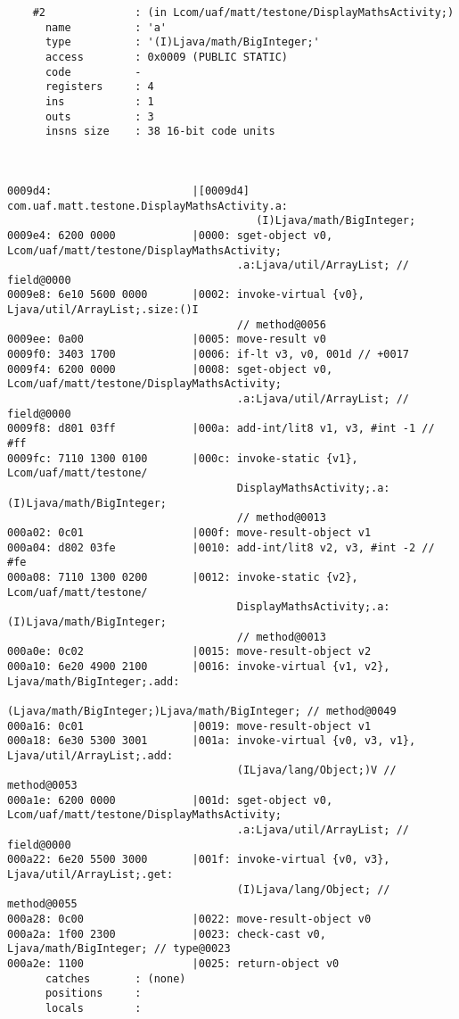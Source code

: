 \begin{lstlisting}
    #2              : (in Lcom/uaf/matt/testone/DisplayMathsActivity;)
      name          : 'a'
      type          : '(I)Ljava/math/BigInteger;'
      access        : 0x0009 (PUBLIC STATIC)
      code          -
      registers     : 4
      ins           : 1
      outs          : 3
      insns size    : 38 16-bit code units



0009d4:                      |[0009d4] com.uaf.matt.testone.DisplayMathsActivity.a:
                                       (I)Ljava/math/BigInteger;
0009e4: 6200 0000            |0000: sget-object v0, Lcom/uaf/matt/testone/DisplayMathsActivity;
                                    .a:Ljava/util/ArrayList; // field@0000
0009e8: 6e10 5600 0000       |0002: invoke-virtual {v0}, Ljava/util/ArrayList;.size:()I
                                    // method@0056
0009ee: 0a00                 |0005: move-result v0
0009f0: 3403 1700            |0006: if-lt v3, v0, 001d // +0017
0009f4: 6200 0000            |0008: sget-object v0, Lcom/uaf/matt/testone/DisplayMathsActivity;
                                    .a:Ljava/util/ArrayList; // field@0000
0009f8: d801 03ff            |000a: add-int/lit8 v1, v3, #int -1 // #ff
0009fc: 7110 1300 0100       |000c: invoke-static {v1}, Lcom/uaf/matt/testone/
                                    DisplayMathsActivity;.a:(I)Ljava/math/BigInteger;
                                    // method@0013
000a02: 0c01                 |000f: move-result-object v1
000a04: d802 03fe            |0010: add-int/lit8 v2, v3, #int -2 // #fe
000a08: 7110 1300 0200       |0012: invoke-static {v2}, Lcom/uaf/matt/testone/
                                    DisplayMathsActivity;.a:(I)Ljava/math/BigInteger;
                                    // method@0013
000a0e: 0c02                 |0015: move-result-object v2
000a10: 6e20 4900 2100       |0016: invoke-virtual {v1, v2}, Ljava/math/BigInteger;.add:
                                    (Ljava/math/BigInteger;)Ljava/math/BigInteger; // method@0049
000a16: 0c01                 |0019: move-result-object v1
000a18: 6e30 5300 3001       |001a: invoke-virtual {v0, v3, v1}, Ljava/util/ArrayList;.add:
                                    (ILjava/lang/Object;)V // method@0053
000a1e: 6200 0000            |001d: sget-object v0, Lcom/uaf/matt/testone/DisplayMathsActivity;
                                    .a:Ljava/util/ArrayList; // field@0000
000a22: 6e20 5500 3000       |001f: invoke-virtual {v0, v3}, Ljava/util/ArrayList;.get:
                                    (I)Ljava/lang/Object; // method@0055
000a28: 0c00                 |0022: move-result-object v0
000a2a: 1f00 2300            |0023: check-cast v0, Ljava/math/BigInteger; // type@0023
000a2e: 1100                 |0025: return-object v0
      catches       : (none)
      positions     :
      locals        :


\end{lstlisting}
